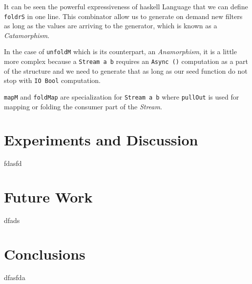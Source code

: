 \documentclass[12pt]{article}
\begin{document}
It can be seen the powerful expressiveness of \acrshort{haskell} Language that we can define \texttt{foldrS} in one line. This combinator
allow us to generate on demand new filters as long as the values are arriving to the generator, which is known as a \textit{Catamorphism}.

In the case of \texttt{unfoldM} which is its counterpart, an \textit{Anamorphism}, it is a little more complex because a \texttt{Stream a b} 
requires an \texttt{Async ()} computation as a part of the structure and we need to generate that as long as our seed function do not stop with \texttt{IO Bool} computation.

\texttt{mapM} and \texttt{foldMap} are specialization for \texttt{Stream a b} where \texttt{pullOut} is used for mapping or folding
the consumer part of the \textit{Stream}.

\section{Experiments and Discussion}
fdasfd

\section{Future Work}
dfads

\section{Conclusions}
dfasfda

\clearpage

\printglossary[type=\acronymtype]

\printglossary




\appendix
\end{document}
